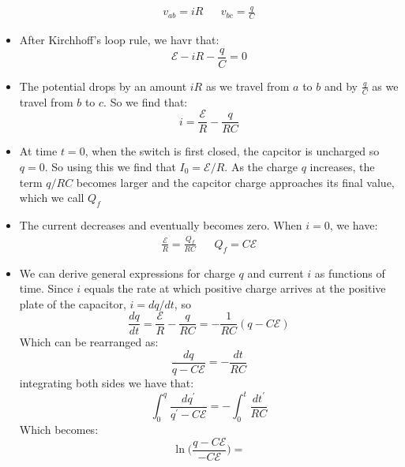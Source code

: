 \documentclass[11pt, a4paper]{article}
\begin{document}
\begin{itemize}
        \begin{align}
            v_{ab} = iR && v_{bc} = \frac{q}{C}
        \end{align}
    \item After Kirchhoff's loop rule, we havr that:
        \begin{equation}
            \mathcal{E} - iR - \frac{q}{C} = 0
        \end{equation}
    \item The potential drops by an amount $iR$ as we travel from $a$ to $b$ and by
        $\frac{q}{C}$ as we travel from $b$ to $c$. So we find that:
        \begin{equation}
            i = \frac{\mathcal{E}}{R} - \frac{q}{RC}
        \end{equation}
    \item At time $t=0$, when the switch is first closed, the capcitor is uncharged so
        $q=0$. So using this we find that $I_{0} = \mathcal{E} / R$. As the charge $q$
        increases, the term $q / RC$ becomes larger and the capcitor charge approaches
        its final value, which we call $Q_f$
    \item The current decreases and eventually becomes zero. When $i = 0$, we have:
        \begin{align}
            \frac{\mathcal{E}}{R} = \frac{Q_f}{RC} && Q_f = C\mathcal{E}
        \end{align}
    \item We can derive general expressions for charge $q$ and current $i$ as functions of
        time. Since $i$ equals the rate at which positive charge arrives at the positive
        plate of the capacitor, $i = dq / dt$, so
        \begin{equation}
            \frac{dq}{dt} = \frac{\mathcal{E}}{R} - \frac{q}{RC} =
            - \frac{1}{RC}(q - C\mathcal{E})
        \end{equation}
        Which can be rearranged as:
        \begin{equation}
            \frac{dq}{q - C\mathcal{E}} = - \frac{dt}{RC}
        \end{equation}
        integrating both sides we have that:
        \begin{equation}
            \int_0^q \frac{dq^{\prime}}{q^{\prime} - C\mathcal{E}} =
            -\int_0^t \frac{dt^{\prime}}{RC}
        \end{equation}
        Which becomes:
        \begin{equation}
           \ln \bigg(\frac{q-C\mathcal{E}}{-C\mathcal{E}}\bigg) =

\end{equation}
\end{itemize}
\end{document}
